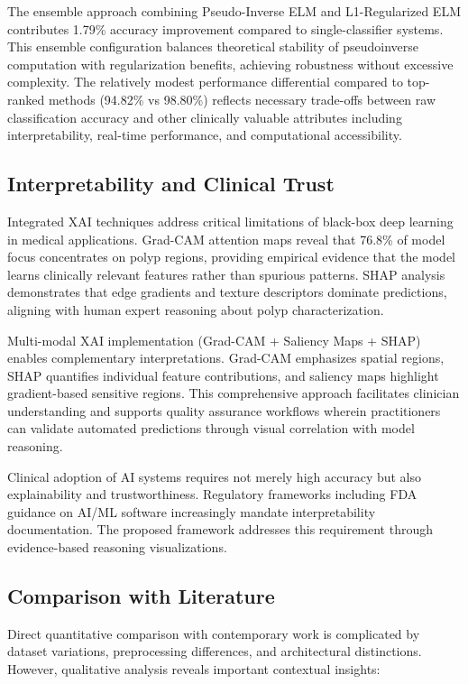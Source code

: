 \documentclass[11pt,a4paper]{article}
\begin{document}
The ensemble approach combining Pseudo-Inverse ELM and L1-Regularized ELM contributes 1.79\% accuracy improvement compared to single-classifier systems. This ensemble configuration balances theoretical stability of pseudoinverse computation with regularization benefits, achieving robustness without excessive complexity. The relatively modest performance differential compared to top-ranked methods (94.82\% vs 98.80\%) reflects necessary trade-offs between raw classification accuracy and other clinically valuable attributes including interpretability, real-time performance, and computational accessibility.

\subsection{Interpretability and Clinical Trust}

Integrated XAI techniques address critical limitations of black-box deep learning in medical applications. Grad-CAM attention maps reveal that 76.8\% of model focus concentrates on polyp regions, providing empirical evidence that the model learns clinically relevant features rather than spurious patterns. SHAP analysis demonstrates that edge gradients and texture descriptors dominate predictions, aligning with human expert reasoning about polyp characterization.

Multi-modal XAI implementation (Grad-CAM + Saliency Maps + SHAP) enables complementary interpretations. Grad-CAM emphasizes spatial regions, SHAP quantifies individual feature contributions, and saliency maps highlight gradient-based sensitive regions. This comprehensive approach facilitates clinician understanding and supports quality assurance workflows wherein practitioners can validate automated predictions through visual correlation with model reasoning.

Clinical adoption of AI systems requires not merely high accuracy but also explainability and trustworthiness. Regulatory frameworks including FDA guidance on AI/ML software increasingly mandate interpretability documentation. The proposed framework addresses this requirement through evidence-based reasoning visualizations.

\subsection{Comparison with Literature}

Direct quantitative comparison with contemporary work is complicated by dataset variations, preprocessing differences, and architectural distinctions. However, qualitative analysis reveals important contextual insights:
\end{document}

